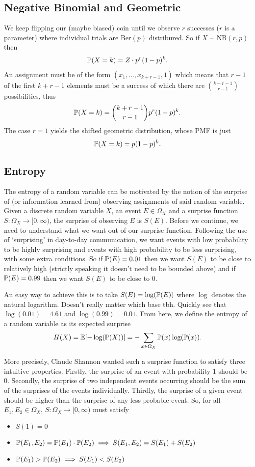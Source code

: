 \documentclass[11pt]{article}
\begin{document}
\begin{appendices}
\subsection{Negative Binomial and Geometric}
We keep flipping our (maybe biased) coin until we observe $r$ successes ($r$ is a parameter) where individual trials are Ber$(p)$ distribured. So if $X\sim\text{NB}(r,p)$ then
$$
\P(X=k)
=
Z\cdot p^r(1-p)^k.
$$
An assignment must be of the form $(x_1,\dots,x_{k+r-1},1)$ which means that $r-1$ of the first $k+r-1$ elements must be a success of which there are $\binom{k+r-1}{r-1}$ possibilities, thus
$$
\P(X=k)
=
\binom{k+r-1}{r-1}p^r(1-p)^k.
$$
The case $r=1$ yields the shifted geometric distribution, whose PMF is just
$$
\P(X=k)
=
p(1-p)^k.
$$

\subsection{Entropy}
The entropy of a random variable can be motivated by the notion of the surprise of (or information learned from) observing assignments of said random variable. Given a discrete random variable $X$, an event $E\in\Omega_X$ and a surprise function $S:\Omega_X\rightarrow[0,\infty)$, the surprise of observing $E$ is $S(E)$. Before we continue, we need to understand what we want out of our surprise function. Following the use of `surprising' in day-to-day communication, we want events with low probability to be highly surprising and events with high probability to be less surprising, with some extra conditions. So if $\P(E)=0.01$ then we want $S(E)$ to be close to relatively high (strictly speaking it doesn't need to be bounded above) and if $\P(E)=0.99$ then we want $S(E)$ to be close to 0.

An easy way to achieve this is to take $S(E)=\log(\P(E))$ where $\log$ denotes the natural logarithm. Doesn't really matter which base tbh. Quickly see that $\log(0.01)=4.61$ and $\log(0.99)=0.01$. From here, we define the entropy of a random variable as its expected surprise
$$
H(X)
=
\E[-\log(\P(X))]
=
-\sum_{x\in \Omega_X}\P(x)\log(\P(x)).
$$

\noindent More precisely, Claude Shannon wanted such a surprise function to satisfy three intuitive properties. Firstly, the surprise of an event with probability $1$ should be $0$. Secondly, the surprise of two independent events occurring should be the sum of the surprises of the events individually. Thirdly, the surprise of a given event should be higher than the surprise of any less probable event. So, for all $E_1,E_2\in\Omega_X$, $S:\Omega_X\rightarrow[0,\infty)$ must satisfy
\begin{itemize}
    \item $S(1)=0$
    \item $\P(E_1,E_2)=\P(E_1)\cdot\P(E_2)\implies S(E_1,E_2)=S(E_1)+S(E_2)$
    \item $\P(E_1)>\P(E_2)\implies S(E_1)<S(E_2)$
\end{itemize}


\end{appendices}
\end{document}
